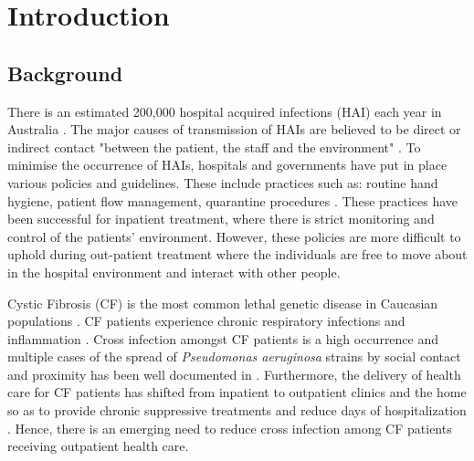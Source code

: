 \chapter{Introduction}\label{ch:intro}

\begin{comment}
	Stages in a thesis introduction:
      ********* state the general topic and give some background --> HAI
      
      ********* define the terms and scope of the topic --> (in Scope)
      
      ********* outline the current situation
      ********* evaluate the current situation (advantages/ disadvantages) and identify the gap
      
      ********* identify the importance of the proposed research
      
      state the research problem/ questions
      ********* state the research aims and/or research objectives  --> (in objectives)
      ********* state the hypotheses  --> (in objectives)
      
      ********* outline the order of information in the thesis --> (in Thesis Outline)
      outline the methodology --> (in Thesis Outline)
\end{comment}

	\section{Background} \label{sec:intro_bg}
      There is an estimated 200,000 hospital acquired infections (HAI) each year in Australia \cite{ausHAI}. The major causes of transmission of HAIs are believed to be direct or indirect contact "between the patient, the staff and the environment" \cite{airTrans}. To minimise the occurrence of HAIs, hospitals and governments have put in place various policies and guidelines. These include practices such as: routine hand hygiene, patient flow management, quarantine procedures \cite{WHOHAI}. These practices have been successful for inpatient treatment, where there is strict monitoring and control of the patients' environment. However, these policies are more difficult to uphold during out-patient treatment where the individuals are free to move about in the hospital environment and interact with other people.

      Cystic Fibrosis (CF) is the most common lethal genetic disease in Caucasian populations \cite{OSullivan20091891}. CF patients experience chronic respiratory infections and inflammation \cite{flume2007cystic}. Cross infection amongst CF patients is a high occurrence and multiple cases of the spread of  \textit{Pseudomonas aeruginosa} strains by social contact and proximity has been well documented in \cite{govan1993evidence, cheng1996spread}. Furthermore, the delivery of health care for CF patients has shifted from inpatient to outpatient clinics and the home so as to provide chronic suppressive treatments and reduce days of hospitalization \cite{infectionCF}. Hence, there is an emerging need to reduce cross infection among CF patients receiving outpatient health care.

